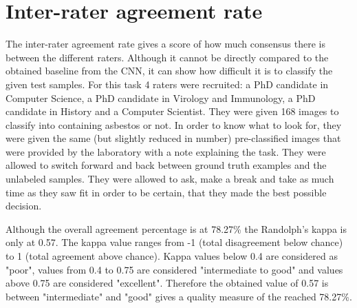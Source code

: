 \section{Inter-rater agreement rate}

The inter-rater agreement rate gives a score of how much consensus there is between the different raters. Although it cannot be directly compared to the obtained baseline from the CNN, it can show how difficult it is to classify the given test samples. For this task 4 raters were recruited: a PhD candidate in Computer Science, a PhD candidate in Virology and Immunology, a PhD candidate in History and a Computer Scientist. They were given 168 images to classify into containing asbestos or not. In order to know what to look for, they were given the same (but slightly reduced in number) pre-classified images that were provided by the laboratory with a note explaining the task. They were allowed to switch forward and back between ground truth examples and the unlabeled samples. They were allowed to ask, make a break and take as much time as they saw fit in order to be certain, that they made the best possible decision.\\


\begin{table}[h] \centering
{}
\caption{Inter-rater agreement rate (Randolph's kappa) of 4 annotators.}
\label{tbl:interagreement}
\end{table}

\quad

Although the overall agreement percentage is at 78.27\% the Randolph's kappa is only at 0.57. The kappa value ranges from -1 (total disagreement below chance) to 1 (total agreement above chance). Kappa values below 0.4 are considered as "poor", values from 0.4 to 0.75  are considered "intermediate to good" and values  above 0.75 are considered "excellent". Therefore the obtained value of 0.57 is between "intermediate" and "good" gives a quality measure of the reached 78.27\%. \\











